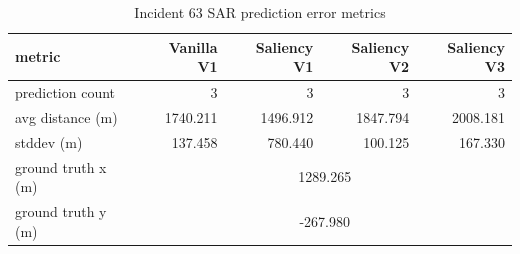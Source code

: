 \begin{table}[ht]
\centering
\caption{Incident 63 SAR prediction error metrics}
\label{tab:sar-incident-63}
\begin{tabular}{lrrrr}
\hline
metric & Vanilla V1 & Saliency V1 & Saliency V2 & Saliency V3 \\
\hline
prediction count & 3 & 3 & 3 & 3 \\
avg distance (m) & 1740.211 & 1496.912 & 1847.794 & 2008.181 \\
stddev (m) & 137.458 & 780.440 & 100.125 & 167.330 \\
ground truth x (m) & \multicolumn{4}{c}{1289.265} \\
ground truth y (m) & \multicolumn{4}{c}{-267.980} \\
\hline
\end{tabular}
\end{table}
